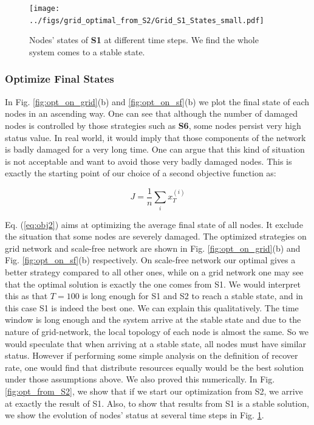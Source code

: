 \begin{figure}
	\centering
	\texttt{[image: ../figs/grid\_optimal\_from\_S2/Grid\_S1\_States\_small.pdf]}
	\caption{Nodes' states of \textbf{S1} at different time steps. We find the whole system comes to a stable state.}
	\label{fig:zhichao}
\end{figure}

\subsubsection{Optimize Final States}
In Fig. \ref{fig:opt_on_grid}(b) and \ref{fig:opt_on_sf}(b) we plot the final state of each nodes in an ascending way. One can see that although the number of damaged nodes is controlled by those strategies such as \textbf{S6}, some nodes persist very high status value. In real world, it would imply that those components of the network is badly damaged for a very long time. One can argue that this kind of situation is not acceptable and want to avoid those very badly damaged nodes. This is exactly the starting point of our choice of a second objective function as:


\begin{equation}
\label{eq:obj2}
	J = \frac{1}{n} \sum_i x_T^{(i)}
\end{equation}

Eq. (\ref{eq:obj2}) aims at optimizing the average final state of all nodes. It exclude the situation that some nodes are severely damaged. The optimized strategies on grid network and scale-free network are shown in Fig. \ref{fig:opt_on_grid}(b) and Fig. \ref{fig:opt_on_sf}(b) respectively. On scale-free network our optimal gives a better strategy compared to all other ones, while on a grid network one may see that the optimal solution is exactly the one comes from S1. We would interpret this as that $T=100$ is long enough for S1 and S2 to reach a stable state, and in this case S1 is indeed the best one. We can explain this qualitatively. The time window is long enough and the system arrive at the stable state and due to the nature of grid-network,  the local topology of each node is almost the same. So we would speculate that when arriving at a stable state, all nodes must have similar status. However if performing some simple analysis on the definition of recover rate, one would find that distribute resources equally would be the best solution under those assumptions above. We also proved this numerically. In Fig. \ref{fig:opt_from_S2}, we show that if we start our optimization from S2, we arrive at exactly the result of S1. Also, to show that results from S1 is a stable solution, we show the evolution of nodes' status at several time steps in Fig. \ref{fig:zhichao}. 


